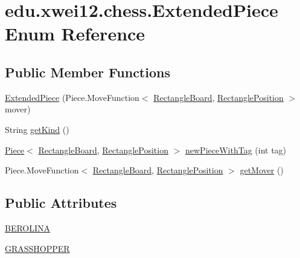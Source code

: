 \hypertarget{enumedu_1_1xwei12_1_1chess_1_1_extended_piece}{}\section{edu.\+xwei12.\+chess.\+Extended\+Piece Enum Reference}
\label{enumedu_1_1xwei12_1_1chess_1_1_extended_piece}
\subsection*{Public Member Functions}
\begin{DoxyCompactItemize}
\item 
\hyperlink{enumedu_1_1xwei12_1_1chess_1_1_extended_piece_adb55c3b4c269c0a81a5d207351c89ac9}{Extended\+Piece} (Piece.\+Move\+Function$<$ \hyperlink{classedu_1_1xwei12_1_1chess_1_1_rectangle_board}{Rectangle\+Board}, \hyperlink{classedu_1_1xwei12_1_1chess_1_1_rectangle_position}{Rectangle\+Position} $>$ mover)
\item 
String \hyperlink{enumedu_1_1xwei12_1_1chess_1_1_extended_piece_a8cd3573ca0b7da118da59f4ecf4ab137}{get\+Kind} ()
\item 
\hyperlink{classedu_1_1xwei12_1_1chess_1_1_piece}{Piece}$<$ \hyperlink{classedu_1_1xwei12_1_1chess_1_1_rectangle_board}{Rectangle\+Board}, \hyperlink{classedu_1_1xwei12_1_1chess_1_1_rectangle_position}{Rectangle\+Position} $>$ \hyperlink{enumedu_1_1xwei12_1_1chess_1_1_extended_piece_a28884c23e589cefbe39421de3fc3300f}{new\+Piece\+With\+Tag} (int tag)
\item 
Piece.\+Move\+Function$<$ \hyperlink{classedu_1_1xwei12_1_1chess_1_1_rectangle_board}{Rectangle\+Board}, \hyperlink{classedu_1_1xwei12_1_1chess_1_1_rectangle_position}{Rectangle\+Position} $>$ \hyperlink{enumedu_1_1xwei12_1_1chess_1_1_extended_piece_a5155315a842a2a0363ab44d7656f273b}{get\+Mover} ()
\end{DoxyCompactItemize}
\subsection*{Public Attributes}
\begin{DoxyCompactItemize}
\item 
\hyperlink{enumedu_1_1xwei12_1_1chess_1_1_extended_piece_ab5339557b124dc900e571d2d8451409e}{B\+E\+R\+O\+L\+I\+NA}
\item 
\hyperlink{enumedu_1_1xwei12_1_1chess_1_1_extended_piece_a383870e686af1f61cec618abbe02996d}{G\+R\+A\+S\+S\+H\+O\+P\+P\+ER}
\end{DoxyCompactItemize}


